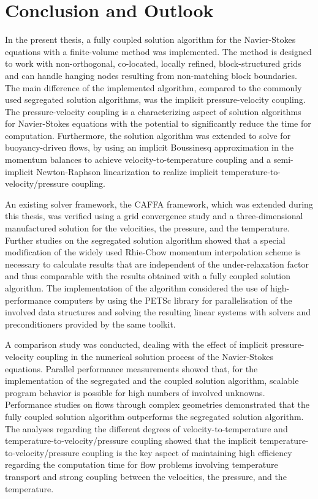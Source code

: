 \chapter{Conclusion and Outlook}
\label{sec:conclusion}

In the present thesis, a fully coupled solution algorithm for the Navier-Stokes equations with a finite-volume method was implemented. The method is designed to work with non-orthogonal, co-located, locally refined, block-structured grids and can handle hanging nodes resulting from non-matching block boundaries. The main difference of the implemented algorithm, compared to the commonly used segregated solution algorithms, was the implicit pressure-velocity coupling. The pressure-velocity coupling is a characterizing aspect of solution algorithms for Navier-Stokes equations with the potential to significantly reduce the time for computation. Furthermore, the solution algorithm was extended to solve for buoyancy-driven flows, by using an implicit Boussinesq approximation in the momentum balances to achieve velocity-to-temperature coupling and a semi-implicit Newton-Raphson linearization to realize implicit temperature-to-velocity/pressure coupling.

An existing solver framework, the CAFFA framework, which was extended during this thesis, was verified using a grid convergence study and a three-dimensional manufactured solution for the velocities, the pressure, and the temperature. Further studies on the segregated solution algorithm showed that a special modification of the widely used Rhie-Chow momentum interpolation scheme is necessary to calculate results that are independent of the under-relaxation factor and thus comparable with the results obtained with a fully coupled solution algorithm. The implementation of the algorithm considered the use of high-performance computers by using the PETSc library for parallelisation of the involved data structures and solving the resulting linear systems with solvers and preconditioners provided by the same toolkit.

A comparison study was conducted, dealing with the effect of implicit pressure-velocity coupling in the numerical solution process of the Navier-Stokes equations. Parallel performance measurements showed that, for the implementation of the segregated and the coupled solution algorithm, scalable program behavior is possible for high numbers of involved unknowns. Performance studies on flows through complex geometries demonstrated that the fully coupled solution algorithm outperforms the segregated solution algorithm. The analyses regarding the different degrees of velocity-to-temperature and temperature-to-velocity/pressure coupling showed that the implicit temperature-to-velocity/pressure coupling is the key aspect of maintaining high efficiency regarding the computation time for flow problems involving temperature transport and strong coupling between the velocities, the pressure, and the temperature.

